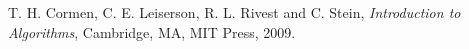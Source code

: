 T. H. Cormen, C. E. Leiserson, R. L. Rivest and C. Stein,
{\em Introduction to Algorithms}, Cambridge, MA, MIT Press, 2009.
